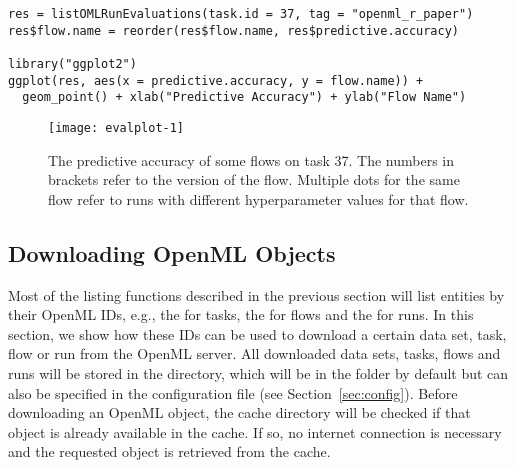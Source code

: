 \begin{knitrout}\small
{}\color{fgcolor}\begin{kframe}
\begin{verbatim}
res = listOMLRunEvaluations(task.id = 37, tag = "openml_r_paper")
res$flow.name = reorder(res$flow.name, res$predictive.accuracy)

library("ggplot2")
ggplot(res, aes(x = predictive.accuracy, y = flow.name)) + 
  geom_point() + xlab("Predictive Accuracy") + ylab("Flow Name")
\end{verbatim}
\end{kframe}\begin{figure}[!h]
\texttt{[image: evalplot-1]} \caption[The predictive accuracy of some  flows on task 37]{The predictive accuracy of some  flows on task 37. The numbers in brackets refer to the version of the flow. Multiple dots for the same flow refer to runs with different hyperparameter values for that flow.}\label{fig:evalplot}
\end{figure}


\end{knitrout}




\subsection{Downloading OpenML Objects}

Most of the listing functions described in the previous section will list entities by
their OpenML IDs, e.g., the  for tasks, the  for flows and the
 for runs. In this section, we show how these IDs can be used to
download a certain data set, task, flow or run from the OpenML server.
All downloaded data sets, tasks, flows and runs will be stored in the
 directory, which will be in the  folder by default
but can also be specified in the configuration file (see Section~\ref{sec:config}).
Before downloading an OpenML object, the cache directory will be checked if that object
is already available in the cache. If so, no internet connection is necessary and the
requested object is retrieved from the cache.



